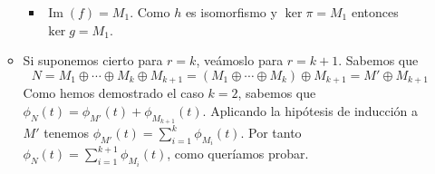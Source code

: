 \documentclass[twoside]{article}
\DeclareMathOperator{\Ima}{Im}
\begin{document}
\begin{solucion}
\begin{enumerate}
\begin{itemize}
\begin{itemize}
\item $\Ima(f)=M_1$. Como $h$ es isomorfismo y $\ker \pi = M_1$ entonces $\ker g = M_1$.
\end{itemize}
\item Si suponemos cierto para $r=k$, veámoslo para $r=k+1$. Sabemos que
$$N=M_1 \oplus \cdots \oplus M_k \oplus M_{k+1} = (M_1 \oplus \cdots \oplus M_k) \oplus M_{k+1} = M' \oplus M_{k+1}$$
Como hemos demostrado el caso $k=2$, sabemos que $\phi_N(t)=\phi_{M'}(t)+\phi_{M_{k+1}}(t)$. Aplicando la hipótesis de inducción a $M'$ tenemos $\phi_{M'}(t)=\sum_{i=1}^k \phi_{M_i}(t)$. Por tanto $\phi_N(t)=\sum_{i=1}^{k+1}\phi_{M_i}(t)$, como queríamos probar.
\end{itemize}
\end{enumerate}
\end{solucion}
\end{document}
